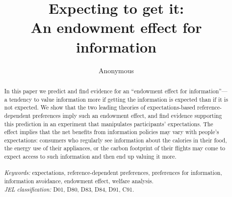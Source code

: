
\title{\vspace{-3cm}
      Expecting to get it: \\ An endowment effect for information
      }


\author{Anonymous
        }

\maketitle

\thispagestyle{empty}   %

\begin{abstract}

\noindent
In this paper we predict and find evidence for an \enquote{endowment effect for information}---a tendency to value information more if getting the information is expected than if it is not expected. We show that the two leading theories of expectations-based reference-dependent preferences imply such an endowment effect, and find evidence supporting this prediction in an experiment that manipulates participants’ expectations. The effect implies that the net benefits from information policies may vary with people’s expectations: consumers who regularly see information about the calories in their food, the energy use of their appliances, or the carbon footprint of their flights may come to expect access to such information and then end up valuing it more.
\\
\\
\textit{Keywords:} expectations, reference-dependent preferences, preferences for information, information avoidance, endowment effect, welfare analysis.
\\
\textit{JEL classification:} D01, D80, D83, D84, D91, C91.

\end{abstract}

\clearpage

